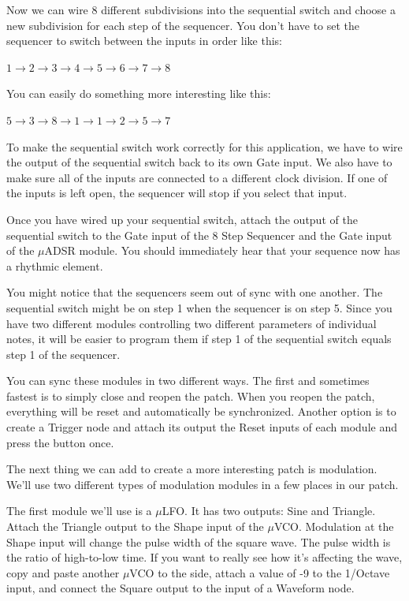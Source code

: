 \documentclass[11pt]{book}
\begin{document}
Now we can wire 8 different subdivisions into the sequential switch and choose a new subdivision for each step of the sequencer. You don't have to set the sequencer to switch between the inputs in order like this:

\begin{center}
$1 \rightarrow 2 \rightarrow 3 \rightarrow 4 \rightarrow 5 \rightarrow 6 \rightarrow 7 \rightarrow 8$
\end{center}

You can easily do something more interesting like this:

\begin{center}
	$5 \rightarrow 3 \rightarrow 8 \rightarrow 1 \rightarrow 1 \rightarrow 2 \rightarrow 5 \rightarrow 7$
\end{center}


To make the sequential switch work correctly for this application, we have to wire the output of the sequential switch back to its own Gate input. We also have to make sure all of the inputs are connected to a different clock division. If one of the inputs is left open, the sequencer will stop if you select that input.

Once you have wired up your sequential switch, attach the output of the sequential switch to the Gate input of the 8 Step Sequencer and the Gate input of the $\mu$ADSR module. You should immediately hear that your sequence now has a rhythmic element.

You might notice that the sequencers seem out of sync with one another. The sequential switch might be on step 1 when the sequencer is on step 5. Since you have two different modules controlling two different parameters of individual notes, it will be easier to program them if step 1 of the sequential switch equals step 1 of the sequencer.

You can sync these modules in two different ways. The first and sometimes fastest is to simply close and reopen the patch. When you reopen the patch, everything will be reset and automatically be synchronized. Another option is to create a Trigger node and attach its output the Reset inputs of each module and press the button once.

The next thing we can add to create a more interesting patch is modulation. We'll use two different types of modulation modules in a few places in our patch.

The first module we'll use is a $\mu$LFO. It has two outputs: Sine and Triangle. Attach the Triangle output to the Shape input of the $\mu$VCO. Modulation at the Shape input will change the pulse width of the square wave. The pulse width is the ratio of high-to-low time. If you want to really see how it's affecting the wave, copy and paste another $\mu$VCO to the side, attach a value of -9 to the 1/Octave input, and connect the Square output to the input of a Waveform node.
\end{document}
